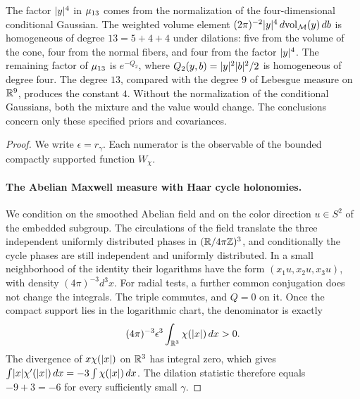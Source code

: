 The factor $\lvert y\rvert^4$ in $\mu_{13}$ comes from the normalization of the four-dimensional conditional Gaussian. The weighted volume element $(2\pi)^{-2}\lvert y\rvert^4\,d\mathrm{vol}_{\mathcal M}(y)\,db$ is homogeneous of degree $13=5+4+4$ under dilations: five from the volume of the cone, four from the normal fibers, and four from the factor $\lvert y\rvert^4$. The remaining factor of $\mu_{13}$ is $e^{-Q_2}$, where $Q_2(y,b)=\lvert y\rvert^2\lvert b\rvert^2/2$ is homogeneous of degree four. The degree $13$, compared with the degree $9$ of Lebesgue measure on $\mathbb R^9$, produces the constant $4$. Without the normalization of the conditional Gaussians, both the mixture and the value would change. The conclusions concern only these specified priors and covariances.

\begin{proof}
We write $\epsilon=r_\gamma$. Each numerator is the observable of the bounded compactly supported function $W_\chi$.

\paragraph{The Abelian Maxwell measure with Haar cycle holonomies.}
We condition on the smoothed Abelian field and on the color direction $u\in S^2$ of the embedded subgroup. The circulations of the field translate the three independent uniformly distributed phases in $(\mathbb R/4\pi\mathbb Z)^3$, and conditionally the cycle phases are still independent and uniformly distributed. In a small neighborhood of the identity their logarithms have the form $(x_1u,x_2u,x_3u)$, with density $(4\pi)^{-3}d^3x$. For radial tests, a further common conjugation does not change the integrals. The triple commutes, and $Q=0$ on it. Once the compact support lies in the logarithmic chart, the denominator is exactly
\[
 (4\pi)^{-3}\epsilon^3\int_{\mathbb R^3}\chi(\lvert x\rvert)\,dx>0.
\]
The divergence of $x\chi(\lvert x\rvert)$ on $\mathbb R^3$ has integral zero, which gives $\int\lvert x\rvert\chi'(\lvert x\rvert)\,dx=-3\int\chi(\lvert x\rvert)\,dx$. The dilation statistic therefore equals $-9+3=-6$ for every sufficiently small $\gamma$.


\end{proof}
